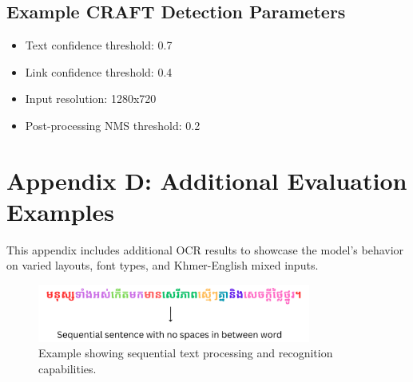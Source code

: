 \subsection*{Example CRAFT Detection Parameters}
\begin{itemize}
    \item Text confidence threshold: 0.7
    \item Link confidence threshold: 0.4
    \item Input resolution: 1280x720
    \item Post-processing NMS threshold: 0.2
\end{itemize}

\clearpage
{}
\label{appendix-d}
\section*{Appendix D: Additional Evaluation Examples}
This appendix includes additional OCR results to showcase the model's behavior on varied layouts, font types, and Khmer-English mixed inputs.

\begin{figure}[h]
    \centering
    \includegraphics[width=0.8\textwidth]{figures/example_of_sequential_text.png}
    \caption{Example showing sequential text processing and recognition capabilities.}
\end{figure}
